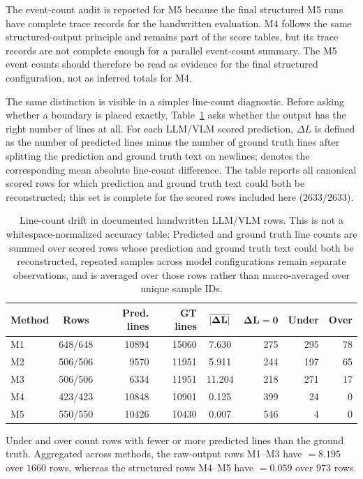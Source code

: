 The event-count audit is reported for M5 because the final structured M5 runs have complete trace records for the handwritten evaluation. M4 follows the same structured-output principle and remains part of the score tables, but its trace records are not complete enough for a parallel event-count summary. The M5 event counts should therefore be read as evidence for the final structured configuration, not as inferred totals for M4.

The same distinction is visible in a simpler line-count diagnostic. Before asking whether a boundary is placed exactly, Table~\ref{tab:exp_line_count_drift} asks whether the output has the right number of lines at all. For each LLM/VLM scored prediction, \(\Delta L\) is defined as the number of predicted lines minus the number of ground truth lines after splitting the prediction and ground truth text on newlines; \MeanAbsLineDelta{} denotes the corresponding mean absolute line-count difference. The table reports all canonical scored rows for which prediction and ground truth text could both be reconstructed; this set is complete for the scored rows included here (\(2633/2633\)).

\begin{table}[H]
  \centering
  \caption{Line-count drift in documented handwritten LLM/VLM rows. This is not a whitespace-normalized accuracy table: Predicted and ground truth line counts are summed over scored rows whose prediction and ground truth text could both be reconstructed, repeated samples across model configurations remain separate observations, and \MeanAbsLineDelta{} is averaged over those rows rather than macro-averaged over unique sample IDs.}
  \label{tab:exp_line_count_drift}
  \footnotesize
  \renewcommand{\arraystretch}{1.08}
  \begin{tabular}{@{}l c r r c r r r@{}}
    \toprule
    \textbf{Method} & \textbf{Rows} & \textbf{Pred. lines} & \textbf{GT lines} & \(\mathbf{\overline{\lvert\Delta L\rvert}}\) & \(\mathbf{\Delta L=0}\) & \textbf{Under} & \textbf{Over} \\
    \midrule
    M1 & 648/648 & 10894 & 15060 & 7.630 & 275 & 295 & 78 \\
    M2 & 506/506 & 9570 & 11951 & 5.911 & 244 & 197 & 65 \\
    M3 & 506/506 & 6334 & 11951 & 11.204 & 218 & 271 & 17 \\
    M4 & 423/423 & 10848 & 10901 & 0.125 & 399 & 24 & 0 \\
    M5 & 550/550 & 10426 & 10430 & 0.007 & 546 & 4 & 0 \\
    \bottomrule
  \end{tabular}
  \vspace{0.35em}

  \parbox{0.96\linewidth}{\footnotesize Under and over count rows with fewer or more predicted lines than the ground truth. Aggregated across methods, the raw-output rows M1--M3 have \MeanAbsLineDelta{} \(=8.195\) over \(1660\) rows, whereas the structured rows M4--M5 have \MeanAbsLineDelta{} \(=0.059\) over \(973\) rows.}
\end{table}


